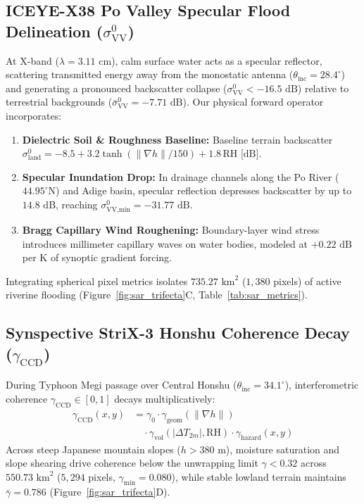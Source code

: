 \documentclass[10pt,twocolumn,letterpaper]{article}
\begin{document}
\subsection{ICEYE-X38 Po Valley Specular Flood Delineation ($\sigma^0_{\text{VV}}$)}
At X-band ($\lambda = 3.11\text{ cm}$), calm surface water acts as a specular reflector, scattering transmitted energy away from the monostatic antenna ($\theta_{\text{inc}} = 28.4^\circ$) and generating a pronounced backscatter collapse ($\sigma^0_{\text{VV}} < -16.5\text{ dB}$) relative to terrestrial backgrounds ($\bar{\sigma}^0_{\text{VV}} = -7.71\text{ dB}$). Our physical forward operator incorporates:
\begin{enumerate}[leftmargin=*,noitemsep,topsep=2pt]
    \item \textbf{Dielectric Soil \& Roughness Baseline:} Baseline terrain backscatter $\sigma^0_{\text{land}} = -8.5 + 3.2\tanh(\lVert\nabla h\rVert/150) + 1.8\,\text{RH}\text{ [dB]}$.
    \item \textbf{Specular Inundation Drop:} In drainage channels along the Po River ($44.95^\circ\text{N}$) and Adige basin, specular reflection depresses backscatter by up to $14.8\text{ dB}$, reaching $\sigma^0_{\text{VV,min}} = -31.77\text{ dB}$.
    \item \textbf{Bragg Capillary Wind Roughening:} Boundary-layer wind stress introduces millimeter capillary waves on water bodies, modeled at $+0.22\text{ dB}$ per K of synoptic gradient forcing.
\end{enumerate}
Integrating spherical pixel metrics isolates \textbf{$735.27\text{ km}^2$} ($1,380$ pixels) of active riverine flooding (Figure~\ref{fig:sar_trifecta}C, Table~\ref{tab:sar_metrics}).

\subsection{Synspective StriX-3 Honshu Coherence Decay ($\gamma_{\text{CCD}}$)}
During Typhoon Megi passage over Central Honshu ($\theta_{\text{inc}} = 34.1^\circ$), interferometric coherence $\gamma_{\text{CCD}} \in [0, 1]$ decays multiplicatively:
\begin{equation}
\begin{split}
    \gamma_{\text{CCD}}(x,y) &= \gamma_0 \cdot \gamma_{\text{geom}}(\lVert\nabla h\rVert) \\
    &\quad \cdot \gamma_{\text{vol}}(\lvert\Delta T_{2m}\rvert, \text{RH}) \cdot \gamma_{\text{hazard}}(x,y)
\end{split}
\end{equation}
Across steep Japanese mountain slopes ($h > 380\text{ m}$), moisture saturation and slope shearing drive coherence below the unwrapping limit $\gamma < 0.32$ across \textbf{$550.73\text{ km}^2$} ($5,294$ pixels, $\gamma_{\text{min}} = 0.080$), while stable lowland terrain maintains $\bar{\gamma} = 0.786$ (Figure~\ref{fig:sar_trifecta}D).
\end{document}
